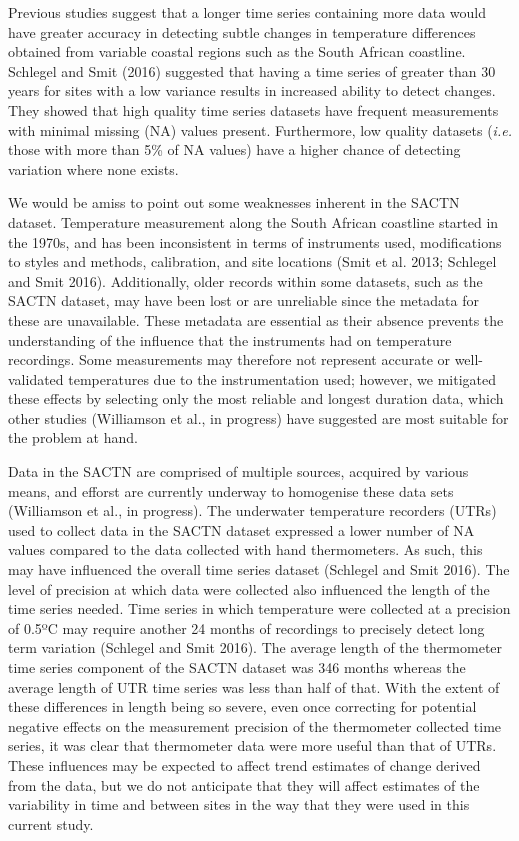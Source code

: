\documentclass[12pt,a4paper,]{article}
\begin{document}
Previous studies suggest that a longer time series containing more data
would have greater accuracy in detecting subtle changes in temperature
differences obtained from variable coastal regions such as the South
African coastline. Schlegel and Smit (2016) suggested that having a time
series of greater than 30 years for sites with a low variance results in
increased ability to detect changes. They showed that high quality time
series datasets have frequent measurements with minimal missing (NA)
values present. Furthermore, low quality datasets (\emph{i.e.} those
with more than 5\% of NA values) have a higher chance of detecting
variation where none exists.

We would be amiss to point out some weaknesses inherent in the SACTN
dataset. Temperature measurement along the South African coastline
started in the 1970s, and has been inconsistent in terms of instruments
used, modifications to styles and methods, calibration, and site
locations (Smit et al. 2013; Schlegel and Smit 2016). Additionally,
older records within some datasets, such as the SACTN dataset, may have
been lost or are unreliable since the metadata for these are
unavailable. These metadata are essential as their absence prevents the
understanding of the influence that the instruments had on temperature
recordings. Some measurements may therefore not represent accurate or
well-validated temperatures due to the instrumentation used; however, we
mitigated these effects by selecting only the most reliable and longest
duration data, which other studies (Williamson et al., in progress) have
suggested are most suitable for the problem at hand.

Data in the SACTN are comprised of multiple sources, acquired by various
means, and efforst are currently underway to homogenise these data sets
(Williamson et al., in progress). The underwater temperature recorders
(UTRs) used to collect data in the SACTN dataset expressed a lower
number of NA values compared to the data collected with hand
thermometers. As such, this may have influenced the overall time series
dataset (Schlegel and Smit 2016). The level of precision at which data
were collected also influenced the length of the time series needed.
Time series in which temperature were collected at a precision of 0.5ºC
may require another 24 months of recordings to precisely detect long
term variation (Schlegel and Smit 2016). The average length of the
thermometer time series component of the SACTN dataset was 346 months
whereas the average length of UTR time series was less than half of
that. With the extent of these differences in length being so severe,
even once correcting for potential negative effects on the measurement
precision of the thermometer collected time series, it was clear that
thermometer data were more useful than that of UTRs. These influences
may be expected to affect trend estimates of change derived from the
data, but we do not anticipate that they will affect estimates of the
variability in time and between sites in the way that they were used in
this current study.
\end{document}
